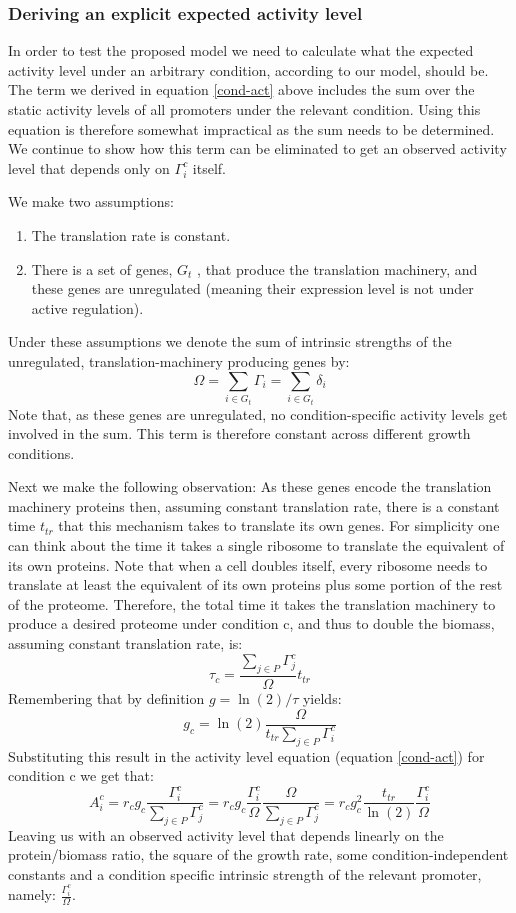 \documentclass[a4page]{report}
\begin{document}
\subsubsection{Deriving an explicit expected activity level}
In order to test the proposed model we need to calculate what the expected activity level under an arbitrary condition, according to our model, should be.
The term we derived in equation \ref{cond-act} above includes the sum over the static activity levels of all promoters under the relevant condition.
Using this equation is therefore somewhat impractical as the sum needs to be determined.
We continue to show how this term can be eliminated to get an observed activity level that depends only on $\Gamma^c_i$ itself.

We make two assumptions:
\begin{enumerate}
\item The translation rate is constant.
\item There is a set of genes, $G_t$ , that produce the translation machinery, and these genes are unregulated (meaning their expression level is not under active regulation).
\end{enumerate}
Under these assumptions we denote the sum of intrinsic strengths of the unregulated, translation-machinery producing genes by:
\[\Omega=\sum_{i \in G_t}\Gamma_i=\sum_{i \in G_t}\delta_i\]
Note that, as these genes are unregulated, no condition-specific activity levels get involved in the sum.
This term is therefore constant across different growth conditions.

Next we make the following observation:
As these genes encode the translation machinery proteins then, assuming constant translation rate, there is a constant time $t_{tr}$ that this mechanism takes to translate its own genes.
For simplicity one can think about the time it takes a single ribosome to translate the equivalent of its own proteins.
Note that when a cell doubles itself, every ribosome needs to translate at least the equivalent of its own proteins plus some portion of the rest of the proteome.
Therefore, the total time it takes the translation machinery to produce a desired proteome under condition c, and thus to double the biomass, assuming constant translation rate, is:
\[\tau_c=\frac{\sum_{j\in P}\Gamma^c_j}{\Omega}t_{tr}\]
Remembering that by  definition $g=\ln(2)/\tau$ yields:
\[g_c=\ln(2)\frac{\Omega}{t_{tr}\sum_{j\in P}\Gamma^c_i}\]
Substituting this result in the activity level equation (equation \ref{cond-act}) for condition c we get that:
\begin{equation}
\label{ind-act}
A^c_i=r_c g_c \frac{\Gamma^c_i}{\sum_{j\in P}\Gamma^c_j}=r_c g_c \frac{\Gamma^c_i}{\Omega}\frac{\Omega}{\sum_{j\in P}\Gamma^c_j}=r_c g_c^2\frac{t_{tr}}{\ln(2)}\frac{\Gamma^c_i}{\Omega}
\end{equation}
Leaving us with an observed activity level that depends linearly on the protein/biomass ratio, the square of the growth rate, some condition-independent constants and a condition specific intrinsic strength of the relevant promoter, namely: $\frac{\Gamma^c_i}{\Omega}$.
\end{document}
